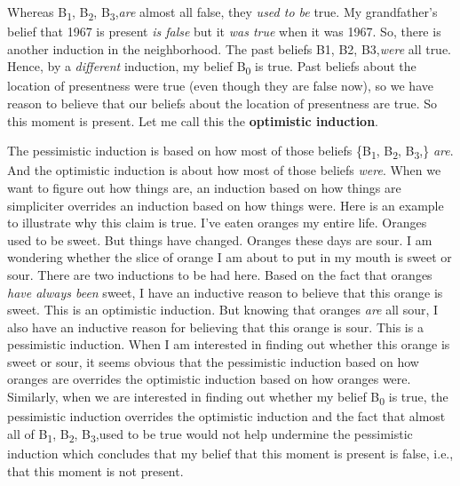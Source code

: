 \documentclass[a4paper,12pt]{article}
\begin{document}
Whereas B\textsubscript{1}, B\textsubscript{2}, B\textsubscript{3},\textellipsis \emph{are} almost all false, they \emph{used to be} true. My grandfather's belief that 1967 is present \emph{is false} but it \emph{was true} when it was 1967. So, there is another induction in the neighborhood. The past beliefs B1, B2, B3,\textellipsis \emph{were} all true. Hence, by a \emph{different} induction, my belief B\textsubscript{0} is true. Past beliefs about the location of presentness were true (even though they are false now), so we have reason to believe that our beliefs about the location of presentness are true. So this moment is present. Let me call this the \textbf{optimistic induction}.

The pessimistic induction is based on how most of those beliefs \{B\textsubscript{1}, B\textsubscript{2}, B\textsubscript{3},\textellipsis\} \emph{are}. And the optimistic induction is about how most of those beliefs \emph{were}. When we want to figure out how things are, an induction based on how things are simpliciter overrides an induction based on how things were. Here is an example to illustrate why this claim is true. I've eaten oranges my entire life. Oranges used to be sweet. But things have changed. Oranges these days are sour. I am wondering whether the slice of orange I am about to put in my mouth is sweet or sour. There are two inductions to be had here. Based on the fact that oranges \emph{have always been} sweet, I have an inductive reason to believe that this orange is sweet. This is an optimistic induction. But knowing that oranges \emph{are} all sour, I also have an inductive reason for believing that this orange is sour. This is a pessimistic induction. When I am interested in finding out whether this orange is sweet or sour, it seems obvious that the pessimistic induction based on how oranges are overrides the optimistic induction based on how oranges were. Similarly, when we are interested in finding out whether my belief B\textsubscript{0} is true, the pessimistic induction overrides the optimistic induction and the fact that almost all of B\textsubscript{1}, B\textsubscript{2}, B\textsubscript{3},\textellipsis used to be true would not help undermine the pessimistic induction which concludes that my belief that this moment is present is false, i.e., that this moment is not present.
\end{document}
